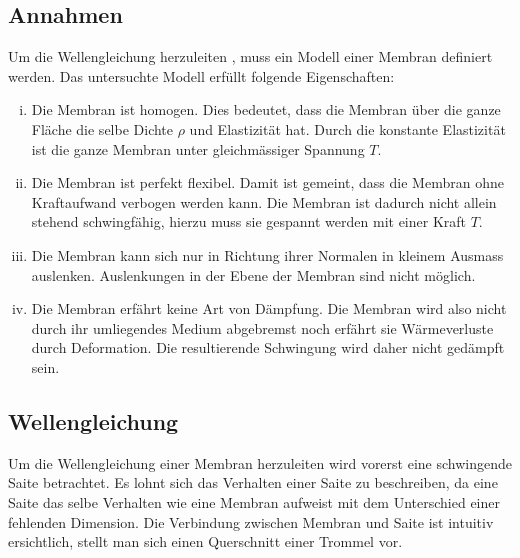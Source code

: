 \subsection{Annahmen} 
Um die Wellengleichung herzuleiten \cite{kreismembran:wellengleichung_herleitung}, muss ein Modell einer Membran definiert werden. 
Das untersuchte Modell erfüllt folgende Eigenschaften:
\begin{enumerate}[i)]
	\item Die Membran ist homogen. 
	Dies bedeutet, dass die Membran über die ganze Fläche die selbe Dichte $ \rho $  und Elastizität hat. 
	Durch die konstante Elastizität ist die ganze Membran unter gleichmässiger Spannung $ T $.
	\item Die Membran ist perfekt flexibel. 
	Damit ist gemeint, dass die Membran ohne Kraftaufwand verbogen werden kann. 
	Die Membran ist dadurch nicht allein stehend schwingfähig, hierzu muss sie gespannt werden mit einer Kraft $ T $.
	\item Die Membran kann sich nur in Richtung ihrer Normalen in kleinem Ausmass auslenken.
	Auslenkungen in der Ebene der Membran sind nicht möglich.
	\item Die Membran erfährt keine Art von Dämpfung. 
	Die Membran wird also nicht durch ihr umliegendes Medium abgebremst noch erfährt sie Wärmeverluste durch Deformation.
	Die resultierende Schwingung wird daher nicht gedämpft sein.
	
\end{enumerate}

\subsection{Wellengleichung} Um die Wellengleichung einer Membran herzuleiten wird vorerst eine schwingende Saite betrachtet.
Es lohnt sich das Verhalten einer Saite zu beschreiben, da eine Saite das selbe Verhalten wie eine Membran aufweist mit dem Unterschied einer fehlenden Dimension.
Die Verbindung zwischen Membran und Saite ist intuitiv ersichtlich, stellt man sich einen Querschnitt einer Trommel vor.

